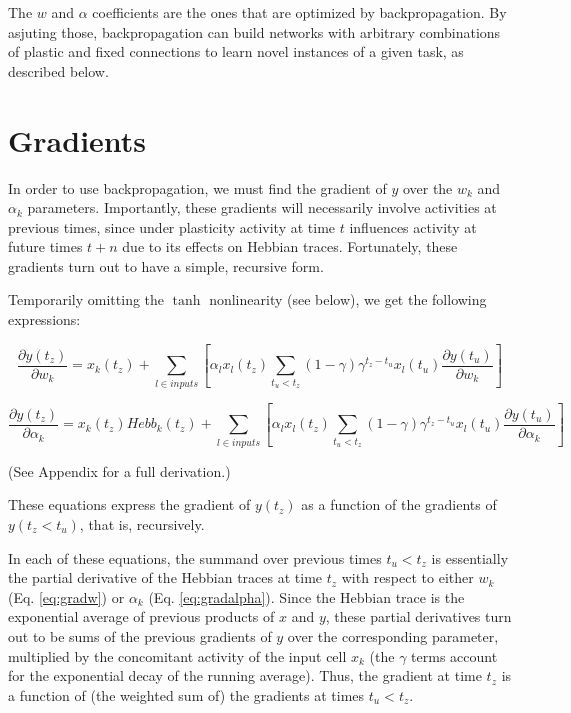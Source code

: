 \documentclass{article}
\begin{document}
The $w$ and $\alpha$ coefficients are the ones that are optimized by
backpropagation. By asjuting those, backpropagation can build networks with
arbitrary combinations of plastic and fixed connections to learn novel
instances of a given task, as described below.

\section{Gradients}

In order to use backpropagation, we must find the gradient of $y$ over the
$w_k$ and $\alpha_k$ parameters. Importantly, these gradients will necessarily
involve activities at previous times, since under plasticity activity at time
$t$ influences activity at future times $t+n$ due to its effects on Hebbian
traces. Fortunately, these gradients turn out to have a simple, recursive form. 

Temporarily omitting the $\tanh$ nonlinearity (see below), we get the
following expressions: 

\begin{equation}
\label{eq:gradw}
\frac{\partial y(t_z)}{\partial w_k} = x_k(t_z) + \sum_{l \in inputs}[\alpha_l
x_l(t_z) \sum_{t_u<t_z}(1-\gamma) \gamma^{t_z-t_u} x_l(t_u) \frac{\partial
y(t_u)}{\partial w_k}]
\end{equation}

\begin{equation}
\label{eq:gradalpha}
\frac{\partial y(t_z)}{\partial \alpha_k} = x_k(t_z) Hebb_k(t_z) + \sum_{l \in inputs}
[\alpha_l x_l(t_z) \sum_{t_u<t_z}(1-\gamma) \gamma^{t_z-t_u} x_l(t_u) \frac{\partial
y(t_u)}{\partial \alpha_k}]
\end{equation}

(See Appendix for a full derivation.)

These equations express the gradient of $y(t_z)$ as a function of the gradients
of $y(t_z<t_u)$, that is, recursively.

In each of these equations, the summand over previous times $t_u<t_z$ is
essentially the partial derivative of the Hebbian traces at time $t_{z}$
with respect to either $w_k$ (Eq. \ref{eq:gradw}) or $\alpha_k$ (Eq.
\ref{eq:gradalpha}). Since the Hebbian trace is the exponential average of
previous products of $x$ and $y$, these partial derivatives turn out to be
sums of the previous gradients of $y$ over the corresponding parameter,
multiplied by the concomitant activity of the input cell $x_k$ (the $\gamma$ terms
account for the exponential decay of the running average). Thus, the gradient at
time $t_z$ is a function of (the weighted sum of) the gradients at times
$t_u<t_z$.
\end{document}
